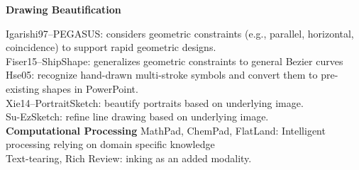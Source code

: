\textbf{Drawing Beautification}

Igarishi97--PEGASUS: considers geometric constraints (e.g., parallel, horizontal, coincidence) to support rapid geometric designs.\\
Fiser15--ShipShape: generalizes geometric constraints to general Bezier curves\\
Hse05: recognize hand-drawn multi-stroke symbols and convert them to pre-existing shapes in PowerPoint.\\
Xie14--PortraitSketch: beautify portraits based on underlying image.\\
Su-EzSketch: refine line drawing based on underlying image.\\
 
\textbf{Computational Processing}
MathPad, ChemPad, FlatLand: Intelligent processing relying on domain specific knowledge\\
Text-tearing, Rich Review: inking as an added modality.

